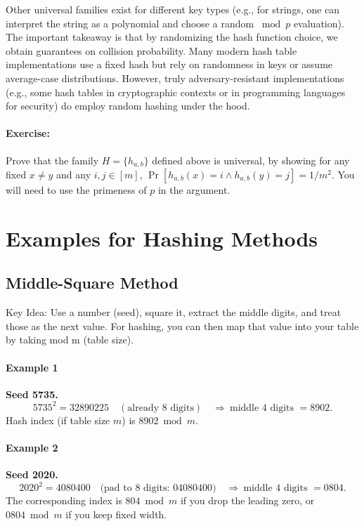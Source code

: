\documentclass[11pt]{article}
\begin{document}
Other universal families exist for different key types (e.g., for strings, one can interpret the string as a polynomial and choose a random $ \bmod p$ evaluation). The important takeaway is that by randomizing the hash function choice, we obtain guarantees on collision probability. Many modern hash table implementations use a fixed hash but rely on randomness in keys or assume average-case distributions. However, truly adversary-resistant implementations (e.g., some hash tables in cryptographic contexts or in programming languages for security) do employ random hashing under the hood.

\paragraph{Exercise:} Prove that the family $H = \{h_{a,b}\}$ defined above is universal, by showing for any fixed $x \neq y$ and any $i,j \in [m]$, $\Pr[h_{a,b}(x)=i \wedge h_{a,b}(y)=j] = 1/m^2$. You will need to use the primeness of $p$ in the argument.


\section{Examples for Hashing Methods}
\subsection{Middle-Square Method}

Key Idea: Use a number (seed), square it, extract the middle digits, and treat those as the next value. For hashing, you can then map that value into your table by taking mod m (table size).


\paragraph{Example 1}
  \textbf{Seed 5735.}
  \[
  5735^2 = 32890225 \quad(\text{already 8 digits})\quad
    \Rightarrow\ \text{middle 4 digits } = \boxed{8902}.
  \]
Hash index (if table size \(m\)) is \(8902 \bmod m\).

\paragraph{Example 2}
  \textbf{Seed 2020.}
  \[
    2020^2 = 4080400 \quad\text{(pad to 8 digits: } 04080400\text{)}\quad
    \Rightarrow\ \text{middle 4 digits } = \boxed{0804}.
  \]
  The corresponding index is \(804 \bmod m\) if you drop the leading zero, or \(0804 \bmod m\) if you keep fixed width.
\end{document}
